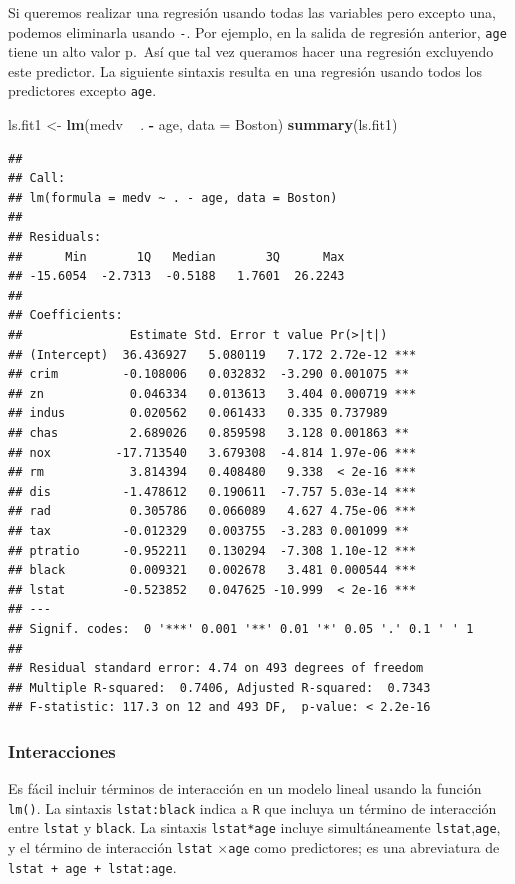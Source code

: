 \documentclass[]{book}
\newenvironment{Shaded}{\begin{snugshade}}{\end{snugshade}}
\newcommand{\KeywordTok}[1]{\textcolor[rgb]{0.13,0.29,0.53}{\textbf{#1}}}
\newcommand{\DataTypeTok}[1]{\textcolor[rgb]{0.13,0.29,0.53}{#1}}
\newcommand{\StringTok}[1]{\textcolor[rgb]{0.31,0.60,0.02}{#1}}
\newcommand{\OperatorTok}[1]{\textcolor[rgb]{0.81,0.36,0.00}{\textbf{#1}}}
\newcommand{\NormalTok}[1]{#1}
\begin{document}
Si queremos realizar una regresión usando todas las variables pero
excepto una, podemos eliminarla usando \texttt{-}. Por ejemplo, en la
salida de regresión anterior, \texttt{age} tiene un alto valor p.~Así
que tal vez queramos hacer una regresión excluyendo este predictor. La
siguiente sintaxis resulta en una regresión usando todos los predictores
excepto \texttt{age}.

\begin{Shaded}
\begin{Highlighting}[]
\NormalTok{ls.fit1 <-}\StringTok{ }\KeywordTok{lm}\NormalTok{(medv }\OperatorTok{~}\StringTok{ }\NormalTok{. }\OperatorTok{-}\StringTok{ }\NormalTok{age, }\DataTypeTok{data =}\NormalTok{ Boston)}
\KeywordTok{summary}\NormalTok{(ls.fit1)}
\end{Highlighting}
\end{Shaded}

\begin{verbatim}
## 
## Call:
## lm(formula = medv ~ . - age, data = Boston)
## 
## Residuals:
##      Min       1Q   Median       3Q      Max 
## -15.6054  -2.7313  -0.5188   1.7601  26.2243 
## 
## Coefficients:
##               Estimate Std. Error t value Pr(>|t|)    
## (Intercept)  36.436927   5.080119   7.172 2.72e-12 ***
## crim         -0.108006   0.032832  -3.290 0.001075 ** 
## zn            0.046334   0.013613   3.404 0.000719 ***
## indus         0.020562   0.061433   0.335 0.737989    
## chas          2.689026   0.859598   3.128 0.001863 ** 
## nox         -17.713540   3.679308  -4.814 1.97e-06 ***
## rm            3.814394   0.408480   9.338  < 2e-16 ***
## dis          -1.478612   0.190611  -7.757 5.03e-14 ***
## rad           0.305786   0.066089   4.627 4.75e-06 ***
## tax          -0.012329   0.003755  -3.283 0.001099 ** 
## ptratio      -0.952211   0.130294  -7.308 1.10e-12 ***
## black         0.009321   0.002678   3.481 0.000544 ***
## lstat        -0.523852   0.047625 -10.999  < 2e-16 ***
## ---
## Signif. codes:  0 '***' 0.001 '**' 0.01 '*' 0.05 '.' 0.1 ' ' 1
## 
## Residual standard error: 4.74 on 493 degrees of freedom
## Multiple R-squared:  0.7406, Adjusted R-squared:  0.7343 
## F-statistic: 117.3 on 12 and 493 DF,  p-value: < 2.2e-16
\end{verbatim}

\subsubsection{Interacciones}\label{interacciones}

Es fácil incluir términos de interacción en un modelo lineal usando la
función \texttt{lm()}. La sintaxis \texttt{lstat:black} indica a
\texttt{R} que incluya un término de interacción entre \texttt{lstat} y
\texttt{black}. La sintaxis \texttt{lstat*age} incluye simultáneamente
\texttt{lstat},\texttt{age}, y el término de interacción \texttt{lstat}
\(\times\)\texttt{age} como predictores; es una abreviatura de
\texttt{lstat\ +\ age\ +\ lstat:age}.
\end{document}
